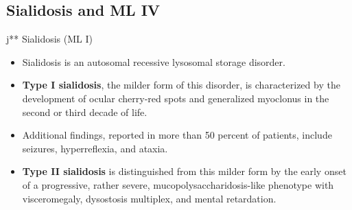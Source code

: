 \documentclass{scrartcl}
\begin{document}
\subsection{Sialidosis and ML IV}
\label{sec:org696b5ca}

j** Sialidosis (ML I)
\begin{itemize}
\item Sialidosis is an autosomal recessive lysosomal storage disorder.

\item \textbf{Type I sialidosis}, the milder form of this disorder, is
characterized by the development of ocular cherry-red spots and
generalized myoclonus in the second or third decade of life.
\item Additional findings, reported in more than 50 percent of patients,
include seizures, hyperreflexia, and ataxia.

\item \textbf{Type II sialidosis} is distinguished from this milder form by the
early onset of a progressive, rather severe,
mucopolysaccharidosis-like phenotype with visceromegaly, dysostosis
multiplex, and mental retardation.
\end{itemize}
\end{document}

